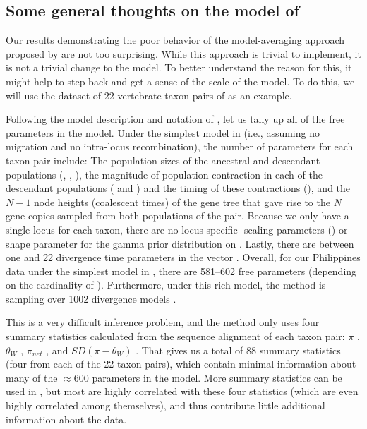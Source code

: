 \documentclass[letterpaper,12pt]{article}
\begin{document}
\begin{linenumbers}
\section*{Some general thoughts on the model of \msb}
Our results demonstrating the poor behavior of the model-averaging approach
proposed by \citet{Hickerson2013} are not too surprising.
While this approach is trivial to implement, it is not a trivial change
to the \msb model.
To better understand the reason for this, it might help to step back and get a
sense of the scale of the \msb model.
To do this, we will use the dataset of 22 vertebrate taxon pairs of
\citet{Oaks2012} as an example.

Following the model description and notation of \citet{Oaks2012}, let us tally
up all of the free parameters in the \msb model.  Under the simplest model in
\msb (i.e., assuming no migration and
no intra-locus recombination), the number of parameters for each
taxon pair include:
The population sizes of the ancestral and descendant populations
(\ancestralTheta{}, , ),
the magnitude of population contraction in each of the descendant
populations ( and ) and the
timing of these contractions (\bottleTime{}), and the $N-1$ node heights
(coalescent times) of the gene tree that gave rise to the $N$ gene
copies sampled from both populations of the pair.
Because we only have a single locus for each taxon, there are no locus-specific
\myTheta{}-scaling parameters (\locusMutationRateScalar{}) or
\locusRateHetShapeParameter shape parameter for the gamma prior distribution on
\locusMutationRateScalar{}.
Lastly, there are between one and 22 divergence time parameters \divt{} in
the vector \divtvector.
Overall, for our Philippines data under the simplest model in \msb, there are
581--602 free parameters (depending on the cardinality of \divtvector).
Furthermore, under this rich model, the method is sampling over 1002 divergence
models \citep[i.e., the number of integer partitions of $Y=22$;][]{Oaks2012}.

This is a very difficult inference problem, and the method only uses four
summary statistics calculated from the sequence alignment of each taxon pair:
$\pi$ \citep{Tajima1983}, $\theta_W$ \citep{Watterson1975}, $\pi_{net}$
\citep{Takahata1985}, and $SD(\pi-\theta_W)$ \citep{Tajima1989}.
That gives us a total of 88 summary statistics (four from each of the 22 taxon
pairs), which contain minimal information about many of the $\approx 600$
parameters in the model.
More summary statistics can be used in \msb, but most are highly correlated
with these four statistics (which are even highly correlated among themselves),
and thus contribute little additional information about the data.


\end{linenumbers}
\end{document}
